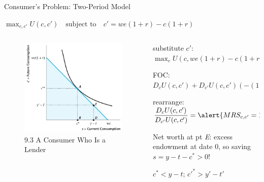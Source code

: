 \documentclass[11pt,aspectratio=169,usenames,dvipsnames]{beamer}
\let\tempone\itemize
\let\temptwo\enditemize
\renewenvironment{itemize}{\tempone\addtolength{\itemsep}{\fill}}{\temptwo}
\begin{document}
\begin{frame}{Consumer's Problem: Two-Period Model}
\label{slide:Consumer_s_Problem__Two_Period_Model}
    \begin{center}
        $\displaystyle \max_{c, c'} U( c, c' ) \quad \text{subject to} \quad c' = we( 1+r ) - c( 1+r )$
    \end{center}
    \begin{columns}
        \begin{column}{0.4\textwidth}
            \begin{figure}
                \caption{\scriptsize 9.3 A Consumer Who Is a Lender}
                \includegraphics[width=\textwidth]{./figures/Figure9_3.jpg}
            \end{figure}
        \end{column}
        \begin{column}{0.6\textwidth}
            \begin{itemize}
                \item substitute $ c' $: $ \displaystyle \max_{c} U( c, we( 1+r ) - c( 1+r ) ) $
                \item FOC: $ \displaystyle D_{c} U( c, c' ) + D_{c'} U( c, c' ) ( -( 1+r ) ) = 0 $
                \item rearrange: $ \displaystyle \frac{D_{c}U( c, c' )}{D_{c'}U( c, c' )} = \alert{MRS_{c, c'} = 1+r} $
                \item Net worth at pt \textit{E}: excess  endowment at date 0, so saving $ s = y - t - c^{*} > 0 $!
                \item $ c^{*} < y - t $; $ c'^{*} > y' - t'$
            \end{itemize}
        \end{column}
    \end{columns}
\end{frame}
\end{document}
